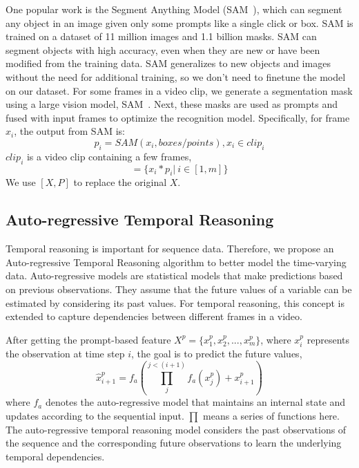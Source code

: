 \documentclass[letterpaper, 10 pt, conference]{ieeeconf}
\begin{document}
One popular work is the Segment Anything Model (SAM~\cite{kirillov2023segment}), which can segment any object in an image given only some prompts like a single click or box. SAM is trained on a dataset of 11 million images and 1.1 billion masks. SAM can segment objects with high accuracy, even when they are new or have been modified from the training data. SAM generalizes to new objects and images without the need for additional training, so we don't need to finetune the model on our dataset. For some frames in a video clip, we generate a segmentation mask using a large vision model, SAM~\cite{kirillov2023segment}. Next, these masks are used as prompts and fused with input frames to optimize the recognition model. Specifically, for frame $x_i$, the output from SAM is:
 \begin{equation}
p_{i} = SAM(x_i, boxes/points), x_i\in clip_i
 \end{equation}
$clip_i$ is a video clip containing a few frames, 
 \begin{equation}
[X,P] = \{x_i*p_{i} | \: i\in[1,m]\}
 \end{equation}
 We use $[X,P]$ to replace the original $X$. 





\subsection{Auto-regressive Temporal Reasoning}
Temporal reasoning is important for sequence data. Therefore, we propose an Auto-regressive Temporal Reasoning algorithm to better model the time-varying data. Auto-regressive models are statistical models that make predictions based on previous observations. They assume that the future values of a variable can be estimated by considering its past values. For temporal reasoning, this concept is extended to capture dependencies between different frames in a video.

After getting the prompt-based feature $X^p=\{x_1^p, x_2^p, ..., x_m^p\}$, where $x_i^p$ represents the observation at time step $i$, the goal is to predict the future values,
\begin{equation}
\hat{x}_{i+1}^p = f_a(\prod_j^{j<(i+1)}f_a(x_j^p)+x_{i+1}^p)
\end{equation}
where $f_a$ denotes the auto-regressive model that maintains an internal state and updates according to the sequential input. $\prod$ means a series of functions here. The auto-regressive temporal reasoning model considers the past observations of the sequence and the corresponding future observations to learn the underlying temporal dependencies. 
\end{document}

